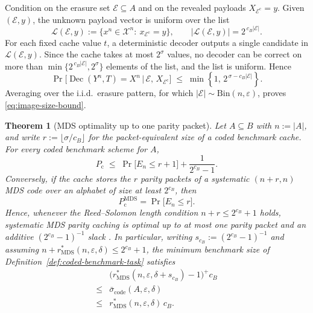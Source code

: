 \documentclass[journal]{IEEEtran}
\makeatletter
\newtheorem{theorem}{Theorem}[section]
\numberwithin{equation}{section}
\renewenvironment{proof}[1][\proofname]{\par
  \pushQED{\qed}%
  \normalfont \topsep6\p@\@plus6\p@\relax
  \trivlist
  \item[\hskip\labelsep
        \itshape
    #1\@addpunct{.}]\ignorespaces
}{%
  \popQED\endtrivlist\@endpefalse
}
\DeclareMathOperator{\Dec}{Dec}
\makeatother
\begin{document}
\begin{proof}
Condition on the erasure set \(\mathcal E\subseteq A\) and on the revealed
payloads \(X_{\mathcal E^{\mathrm c}}=y\).  Given \((\mathcal E,y)\), the
unknown payload vector is uniform over the list
\[
  \mathcal L(\mathcal E,y)
  :=
  \bigl\{x^n\in\mathcal X^n:\ x_{\mathcal E^{\mathrm c}}=y\bigr\},
  \qquad
  |\mathcal L(\mathcal E,y)|=2^{\,c_B|\mathcal E|}.
\]
For each fixed cache value \(t\), a deterministic decoder outputs a single
candidate in \(\mathcal L(\mathcal E,y)\).  Since the cache takes at most
\(2^{\sigma}\) values, no decoder can be correct on more than
\(\min\{2^{\,c_B|\mathcal E|},2^{\sigma}\}\) elements of the list, and the
list is uniform.  Hence
\[
  \Pr\!\bigl[\Dec(Y^n,T)=X^n
  \,\big|\,
  \mathcal E,\,X_{\mathcal E^{\mathrm c}}\bigr]
  \;\le\;
  \min\!\left\{1,\,2^{\,\sigma-c_B|\mathcal E|}\right\}.
\]
Averaging over the i.i.d.\ erasure pattern, for which
\(|\mathcal E|\sim\mathrm{Bin}(n,\varepsilon)\), proves
\eqref{eq:image-size-bound}.
\end{proof}

\begin{theorem}[MDS optimality up to one parity packet]
\label{thm:mds-near-optimality}
Let \(A\subseteq B\) with \(n:=|A|\), and write
\(r:=\lfloor\sigma/c_B\rfloor\) for the packet-equivalent size of a coded
benchmark cache.  For every coded benchmark scheme for \(A\),
\begin{equation}
  P_{\mathrm c}
  \;\le\;
  \Pr\!\bigl[E_n\le r+1\bigr]
  +
  \frac{1}{2^{c_B}-1}.
\label{eq:mds-converse-sandwich}
\end{equation}
Conversely, if the cache stores the \(r\) parity packets of a systematic
\((n+r,n)\) MDS code over an alphabet of size at least \(2^{c_B}\), then
\begin{equation}
  P_{\mathrm c}^{\mathrm{MDS}}
  =
  \Pr\!\bigl[E_n\le r\bigr].
\label{eq:mds-exact-ach}
\end{equation}
Hence, whenever the Reed--Solomon length condition \(n+r\le 2^{c_B}+1\)
holds, systematic MDS parity caching is optimal up to at most one parity
packet and an additive \((2^{c_B}-1)^{-1}\) slack
\cite{singleton1964maximum,macwilliams1977theory}.  In particular, writing
\(s_{c_B}:=(2^{c_B}-1)^{-1}\) and assuming
\(n+r_{\mathrm{MDS}}^*(n,\varepsilon,\delta)\le 2^{c_B}+1\), the minimum
benchmark size of Definition~\ref{def:coded-benchmark-task} satisfies
\begin{equation}
  \begin{aligned}
    & \bigl( r_{\mathrm{MDS}}^* (n,\varepsilon,\delta+s_{c_B}) - 1 \bigr)^+ c_B \\
    \le &\bar\sigma_{\mathrm{code}}(A,\varepsilon,\delta) \\
    \le &r_{\mathrm{MDS}}^*(n,\varepsilon,\delta)\,c_B.
  \end{aligned}
\label{eq:sigma-bar-one-packet}
\end{equation}
\end{theorem}
\end{document}
